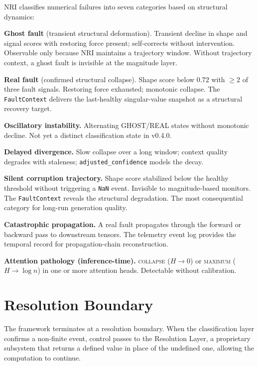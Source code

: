 \documentclass[11pt,a4paper]{article}
\theoremstyle{plain}
\begin{document}
NRI classifies numerical failures into seven categories based on
structural dynamics:

\textbf{Ghost fault} (transient structural deformation).
Transient decline in shape and signal scores with restoring force
present; self-corrects without intervention.
Observable only because NRI maintains a trajectory window.
Without trajectory context, a ghost fault is invisible at the
magnitude layer.

\textbf{Real fault} (confirmed structural collapse).
Shape score below $0.72$ with $\geq 2$ of three fault signals.
Restoring force exhausted; monotonic collapse.
The \texttt{FaultContext} delivers the last-healthy singular-value
snapshot as a structural recovery target.

\textbf{Oscillatory instability.}
Alternating GHOST/REAL states without monotonic decline.
Not yet a distinct classification state in v0.4.0.

\textbf{Delayed divergence.}
Slow collapse over a long window; context quality degrades with
staleness; \texttt{adjusted\_confidence} models the decay.

\textbf{Silent corruption trajectory.}
Shape score stabilized below the healthy threshold without triggering
a \texttt{NaN} event.
Invisible to magnitude-based monitors.
The \texttt{FaultContext} reveals the structural degradation.
The most consequential category for long-run generation quality.

\textbf{Catastrophic propagation.}
A real fault propagates through the forward or backward pass to
downstream tensors.
The telemetry event log provides the temporal record for
propagation-chain reconstruction.

\textbf{Attention pathology (inference-time).}
\textsc{collapse} ($H \to 0$) or \textsc{maximum}
($H \to \log n$) in one or more attention heads.
Detectable without calibration.


\section{Resolution Boundary}
\label{sec:resolution}

The framework terminates at a resolution boundary. When the classification
layer confirms a non-finite event, control passes to the Resolution Layer,
a proprietary subsystem that returns a defined value in place of the
undefined one, allowing the computation to continue.
\end{document}
